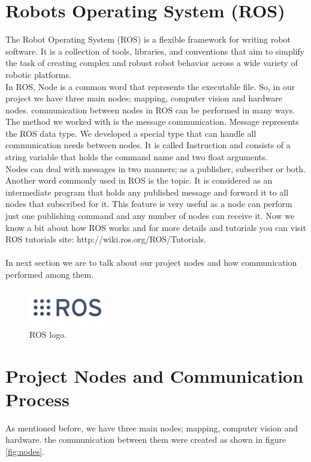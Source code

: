 \documentclass[12pt]{book}
\begin{document}
\section{Robots Operating System (ROS)}
The Robot Operating System (ROS) is a flexible framework for writing robot software. It is a collection of tools, libraries, and conventions that aim to simplify the task of creating complex and robust robot behavior across a wide variety of robotic platforms. \cite{201} \\
In ROS, Node is a common word that represents the executable file. So, in our project we have three main nodes; mapping, computer vision and hardware nodes. communication between nodes in ROS can be performed in many ways. The method we worked with is the message communication. Message represents the ROS data type. We developed a special type that can handle all communication needs between nodes. It is called Instruction and consists of a string variable that holds the command name and two float arguments. \\
Nodes can deal with messages in two manners; as a publisher, subscriber or both. Another word commonly used in ROS is the topic. It is considered as an intermediate program that holds any published message and forward it to all nodes that subscribed for it. This feature is very useful as a node can perform just one publishing command and any number of nodes can receive it. 
Now we know a bit about how ROS works and for more details and tutorials you can visit ROS tutorials site: http://wiki.ros.org/ROS/Tutorials. \\ \\
In next section we are to talk about our project nodes and how communication performed among them.
\begin{figure}
	\centering
	\includegraphics[width = 0.3\textwidth]{Fig/rosLogo.png}
	\caption{ROS logo.}
\end{figure}


\section{Project Nodes and Communication Process}
As mentioned before, we have three main nodes; mapping, computer vision and hardware. the communication between them were created as shown in figure \ref{fig:nodes}. 
\end{document}
